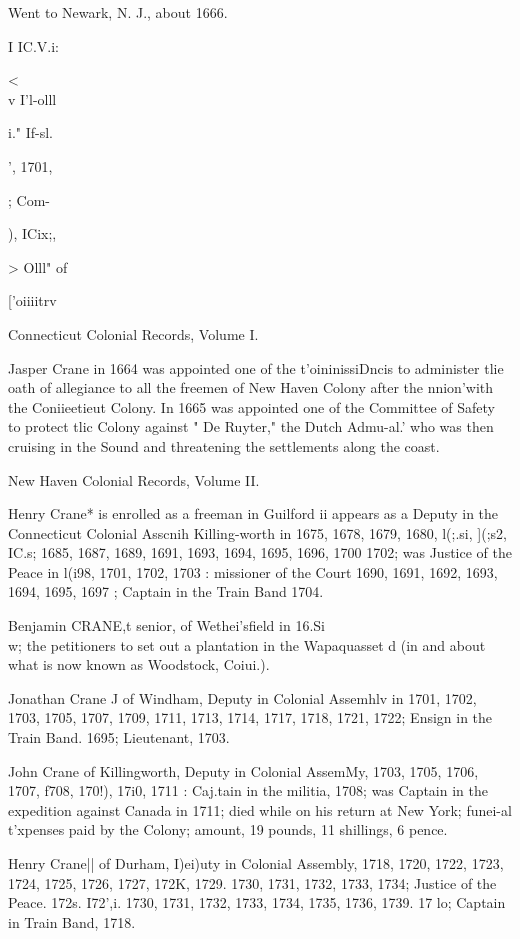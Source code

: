 Went to Newark, N. J., about 1666. 



I IC.V.i: 


<\\v I'l-olll 


i." If-sl. 


', 1701, 


; Com- 


), ICix;, 


> Olll" of 


['oiiiitrv 




Connecticut Colonial Records, Volume I. 

Jasper Crane in 1664 was appointed one of the t'oininissiDncis 
to administer tlie oath of allegiance to all the freemen of New 
Haven Colony after the nnion'with the Coniieetieut Colony. In 
1665 was appointed one of the Committee of Safety to protect tlic 
Colony against " De Ruyter," the Dutch Admu-al.' who was then 
cruising in the Sound and threatening the settlements along the 
coast. 

New Haven Colonial Records, Volume II. 

Henry Crane* is enrolled as a freeman in Guilford ii 
appears as a Deputy in the Connecticut Colonial Asscnih 
Killing-worth in 1675, 1678, 1679, 1680, l(;.si, ](;s2, IC.s; 
1685, 1687, 1689, 1691, 1693, 1694, 1695, 1696, 1700 
1702; was Justice of the Peace in l(i98, 1701, 1702, 1703 : 
missioner of the Court 1690, 1691, 1692, 1693, 1694, 1695, 
1697 ; Captain in the Train Band 1704. 

Benjamin CRANE,t senior, of Wethei'sfield in 16.Si\\ w; 
the petitioners to set out a plantation in the Wapaquasset d 
(in and about what is now known as Woodstock, Coiui.). 

Jonathan Crane J of Windham, Deputy in Colonial Assemhlv 
in 1701, 1702, 1703, 1705, 1707, 1709, 1711, 1713, 1714, 1717, 
1718, 1721, 1722; Ensign in the Train Band. 1695; Lieutenant, 
1703. 

John Crane of Killingworth, Deputy in Colonial AssemMy, 
1703, 1705, 1706, 1707, f708, 170!), 17i0, 1711 : Caj.tain in the 
militia, 1708; was Captain in the expedition against Canada in 
1711; died while on his return at New York; funei-al t'xpenses 
paid by the Colony; amount, 19 pounds, 11 shillings, 6 pence. 

Henry Crane|| of Durham, I)ei)uty in Colonial Assembly, 
1718, 1720, 1722, 1723, 1724, 1725, 1726, 1727, 172K, 1729. 
1730, 1731, 1732, 1733, 1734; Justice of the Peace. 172s. I72',i. 
1730, 1731, 1732, 1733, 1734, 1735, 1736, 1739. 17 lo; Captain 
in Train Band, 1718. 

